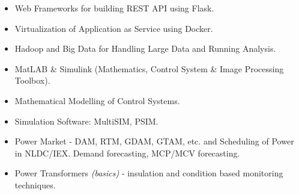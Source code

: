 \begin{multicols}{2}
	\begin{itemize}
		\item Web Frameworks for building REST API using Flask.
		\item Virtualization of Application as Service using Docker.
		\item Hadoop and Big Data for Handling Large Data and Running Analysis.
		\item MatLAB \& Simulink (Mathematics, Control System \& Image Processing Toolbox).
		\item Mathematical Modelling of Control Systems.
		\item Simulation Software: MultiSIM, PSIM.
        \item Power Market - DAM, RTM, GDAM, GTAM, etc. and Scheduling of Power in NLDC/IEX. Demand forecasting, MCP/MCV forecasting.
        \item Power Transformers \textit{(basics)} - insulation and condition based monitoring techniques.
	\end{itemize}
\end{multicols}